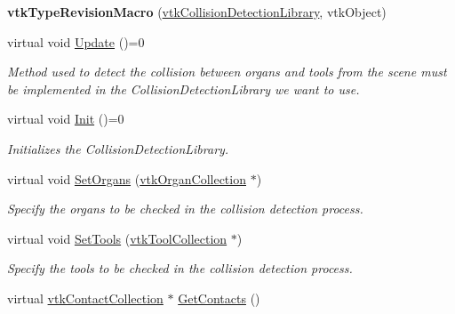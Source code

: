 \begin{DoxyCompactItemize}
\item 
\hypertarget{classvtkCollisionDetectionLibrary_a2acb486cd6986078710736aa56725fa2}{
{\bfseries vtkTypeRevisionMacro} (\hyperlink{classvtkCollisionDetectionLibrary}{vtkCollisionDetectionLibrary}, vtkObject)}
\label{classvtkCollisionDetectionLibrary_a2acb486cd6986078710736aa56725fa2}

\item 
virtual void \hyperlink{classvtkCollisionDetectionLibrary_ae3ce4d5055eee783a8bf9f06f62f5667}{Update} ()=0
\begin{DoxyCompactList}\small\item\em Method used to detect the collision between organs and tools from the scene must be implemented in the CollisionDetectionLibrary we want to use. \item\end{DoxyCompactList}\item 
virtual void \hyperlink{classvtkCollisionDetectionLibrary_ac29256d189958f001608f8f5d170a73c}{Init} ()=0
\begin{DoxyCompactList}\small\item\em Initializes the CollisionDetectionLibrary. \item\end{DoxyCompactList}\item 
\hypertarget{classvtkCollisionDetectionLibrary_ab6eec8c24ba31d95a3262f166b04abd5}{
virtual void \hyperlink{classvtkCollisionDetectionLibrary_ab6eec8c24ba31d95a3262f166b04abd5}{SetOrgans} (\hyperlink{classvtkOrganCollection}{vtkOrganCollection} $\ast$)}
\label{classvtkCollisionDetectionLibrary_ab6eec8c24ba31d95a3262f166b04abd5}

\begin{DoxyCompactList}\small\item\em Specify the organs to be checked in the collision detection process. \item\end{DoxyCompactList}\item 
\hypertarget{classvtkCollisionDetectionLibrary_a1d8fc93368d985f25151cd5fb1323686}{
virtual void \hyperlink{classvtkCollisionDetectionLibrary_a1d8fc93368d985f25151cd5fb1323686}{SetTools} (\hyperlink{classvtkToolCollection}{vtkToolCollection} $\ast$)}
\label{classvtkCollisionDetectionLibrary_a1d8fc93368d985f25151cd5fb1323686}

\begin{DoxyCompactList}\small\item\em Specify the tools to be checked in the collision detection process. \item\end{DoxyCompactList}\item 
\hypertarget{classvtkCollisionDetectionLibrary_abe7ebe2c583c8fce81e0e0ec1d8fb703}{
virtual \hyperlink{classvtkContactCollection}{vtkContactCollection} $\ast$ \hyperlink{classvtkCollisionDetectionLibrary_abe7ebe2c583c8fce81e0e0ec1d8fb703}{GetContacts} ()}
\label{classvtkCollisionDetectionLibrary_abe7ebe2c583c8fce81e0e0ec1d8fb703}


\end{DoxyCompactItemize}
